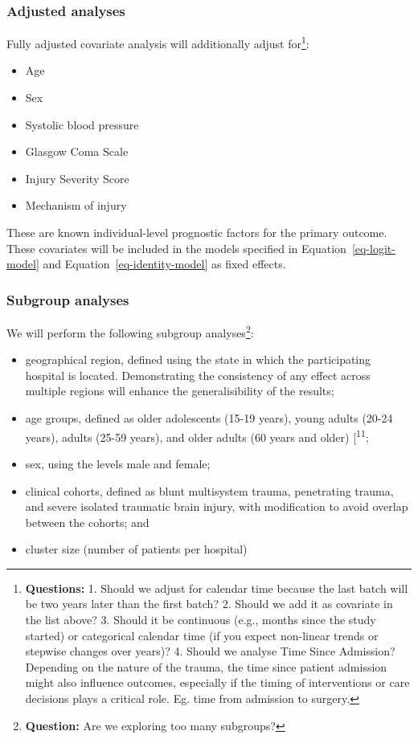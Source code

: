 \documentclass[
]{scrartcl}
\providecommand{\tightlist}{%
  \setlength{\itemsep}{0pt}\setlength{\parskip}{0pt}}\usepackage{longtable,booktabs,array}
\begin{document}
\hypertarget{adjusted-analyses}{%
\subsubsection{Adjusted analyses}\label{adjusted-analyses}}

Fully adjusted covariate analysis will additionally adjust
for\footnote{\textbf{Questions:} 1. Should we adjust for calendar time
  because the last batch will be two years later than the first batch?
  2. Should we add it as covariate in the list above? 3. Should it be
  continuous (e.g., months since the study started) or categorical
  calendar time (if you expect non-linear trends or stepwise changes
  over years)? 4. Should we analyse Time Since Admission? Depending on
  the nature of the trauma, the time since patient admission might also
  influence outcomes, especially if the timing of interventions or care
  decisions plays a critical role. Eg. time from admission to surgery.}:

\begin{itemize}
\tightlist
\item
  Age
\item
  Sex
\item
  Systolic blood pressure
\item
  Glasgow Coma Scale
\item
  Injury Severity Score
\item
  Mechanism of injury
\end{itemize}

These are known individual-level prognostic factors for the primary
outcome. These covariates will be included in the models specified in
Equation~\ref{eq-logit-model} and Equation~\ref{eq-identity-model} as
fixed effects.

\hypertarget{subgroup-analyses}{%
\subsubsection{Subgroup analyses}\label{subgroup-analyses}}

We will perform the following subgroup analyses\footnote{\textbf{Question:}
  Are we exploring too many subgroups?}:

\begin{itemize}
\tightlist
\item
  geographical region, defined using the state in which the
  participating hospital is located. Demonstrating the consistency of
  any effect across multiple regions will enhance the generalisibility
  of the results;
\item
  age groups, defined as older adolescents (15-19 years), young adults
  (20-24 years), adults (25-59 years), and older adults (60 years and
  older) {[}\textsuperscript{11};
\item
  sex, using the levels male and female;
\item
  clinical cohorts, defined as blunt multisystem trauma, penetrating
  trauma, and severe isolated traumatic brain injury, with modification
  to avoid overlap between the cohorts; and
\item
  cluster size (number of patients per hospital)
\end{itemize}
\end{document}
